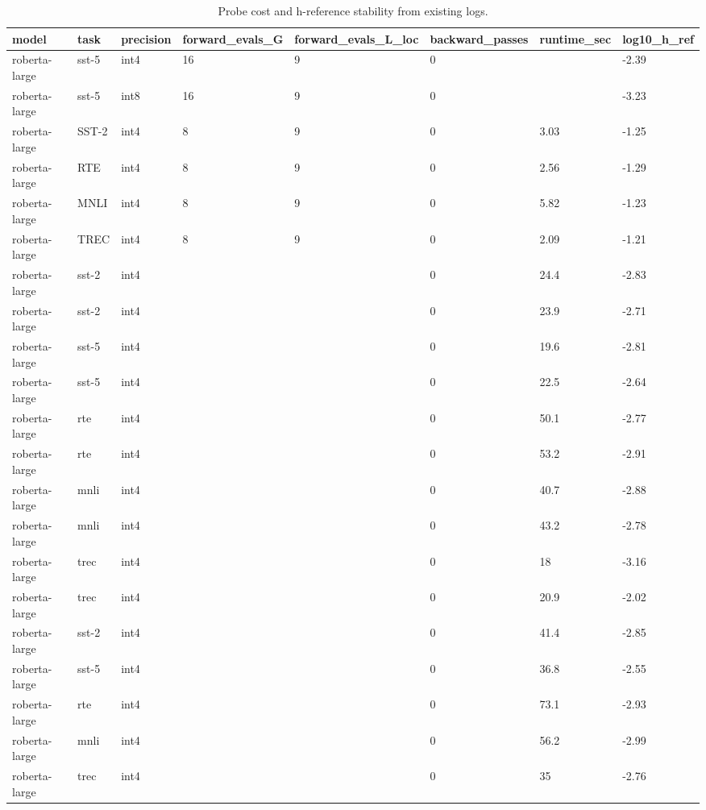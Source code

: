 \begin{table}[t]
\centering
\small
\begin{tabular}{llllllll}
\toprule
model & task & precision & forward\_evals\_G & forward\_evals\_L\_loc & backward\_passes & runtime\_sec & log10\_h\_ref \\
\midrule
roberta-large & sst-5 & int4 & 16 & 9 & 0 &  & -2.39 \\
roberta-large & sst-5 & int8 & 16 & 9 & 0 &  & -3.23 \\
roberta-large & SST-2 & int4 & 8 & 9 & 0 & 3.03 & -1.25 \\
roberta-large & RTE & int4 & 8 & 9 & 0 & 2.56 & -1.29 \\
roberta-large & MNLI & int4 & 8 & 9 & 0 & 5.82 & -1.23 \\
roberta-large & TREC & int4 & 8 & 9 & 0 & 2.09 & -1.21 \\
roberta-large & sst-2 & int4 &  &  & 0 & 24.4 & -2.83 \\
roberta-large & sst-2 & int4 &  &  & 0 & 23.9 & -2.71 \\
roberta-large & sst-5 & int4 &  &  & 0 & 19.6 & -2.81 \\
roberta-large & sst-5 & int4 &  &  & 0 & 22.5 & -2.64 \\
roberta-large & rte & int4 &  &  & 0 & 50.1 & -2.77 \\
roberta-large & rte & int4 &  &  & 0 & 53.2 & -2.91 \\
roberta-large & mnli & int4 &  &  & 0 & 40.7 & -2.88 \\
roberta-large & mnli & int4 &  &  & 0 & 43.2 & -2.78 \\
roberta-large & trec & int4 &  &  & 0 & 18 & -3.16 \\
roberta-large & trec & int4 &  &  & 0 & 20.9 & -2.02 \\
roberta-large & sst-2 & int4 &  &  & 0 & 41.4 & -2.85 \\
roberta-large & sst-5 & int4 &  &  & 0 & 36.8 & -2.55 \\
roberta-large & rte & int4 &  &  & 0 & 73.1 & -2.93 \\
roberta-large & mnli & int4 &  &  & 0 & 56.2 & -2.99 \\
roberta-large & trec & int4 &  &  & 0 & 35 & -2.76 \\
\bottomrule
\end{tabular}
\caption{Probe cost and h-reference stability from existing logs.}
\label{tab:cost_stability}
\end{table}
